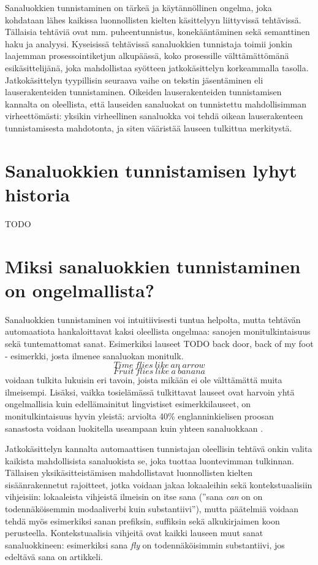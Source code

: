 \documentclass[utf8,bachelor,manualbib]{gradu3}
\begin{document}
Sanaluokkien tunnistaminen on tärkeä ja käytännöllinen ongelma, joka kohdataan lähes kaikissa luonnollisten kielten käsittelyyn liittyvissä tehtävissä. Tällaisia tehtäviä ovat mm. puheentunnistus, konekääntäminen sekä semanttinen haku ja analyysi. Kyseisissä tehtävissä sanaluokkien tunnistaja toimii jonkin laajemman prosessointiketjun alkupäässä, koko prosessille välttämättömänä esikäsittelijänä, joka mahdollistaa syötteen jatkokäsittelyn korkeammalla tasolla. Jatkokäsittelyn tyypillisin seuraava vaihe on tekstin jäsentäminen eli lauserakenteiden tunnistaminen. Oikeiden lauserakenteiden tunnistamisen kannalta on oleellista, että lauseiden sanaluokat on tunnistettu mahdollisimman virheettömästi: yksikin virheellinen sanaluokka voi tehdä oikean lauserakenteen tunnistamisesta mahdotonta, ja siten vääristää lauseen tulkittua merkitystä.


\section{Sanaluokkien tunnistamisen lyhyt historia}

TODO


\section{Miksi sanaluokkien tunnistaminen on ongelmallista?}

Sanaluokkien tunnistaminen voi intuitiivisesti tuntua helpolta, mutta tehtävän automaatiota hankaloittavat kaksi oleellista ongelmaa: sanojen monitulkintaisuus sekä tuntemattomat sanat. Esimerkiksi lauseet
TODO back door, back of my foot - esimerkki, josta ilmenee sanaluokan monitulk.
\[Time\: flies\: like\: an\: arrow\]
\[Fruit\: flies\: like\: a\: banana\]
voidaan tulkita lukuisin eri tavoin, joista mikään ei ole välttämättä muita ilmeisempi. Lisäksi, vaikka tosielämässä tulkittavat lauseet ovat harvoin yhtä ongelmallisia kuin edellämainitut lingvistiset esimerkkilauseet, on monitulkintaisuus hyvin yleistä: arviolta 40\% englanninkielisen proosan sanastosta voidaan luokitella useampaan kuin yhteen sanaluokkaan \citep{derose1988}. 

Jatkokäsittelyn kannalta automaattisen tunnistajan oleellisin tehtävä onkin valita kaikista mahdollisista sanaluokista se, joka tuottaa luontevimman tulkinnan. Tällaisen yksikäsitteistämisen mahdollistavat luonnollisten kielten sisäänrakennetut rajoitteet, jotka voidaan jakaa lokaaleihin sekä kontekstuaalisiin vihjeisiin: lokaaleista vihjeistä ilmeisin on itse sana (''sana \textit{can} on on todennäköisemmin modaaliverbi kuin substantiivi''), mutta päätelmiä voidaan tehdä myös esimerkiksi sanan prefiksin, suffiksin sekä alkukirjaimen koon perusteella. Kontekstuaalisia vihjeitä ovat kaikki lauseen muut sanat sanaluokkineen: esimerkiksi sana \textit{fly} on todennäköisimmin substantiivi, jos edeltävä sana on artikkeli.
\end{document}
